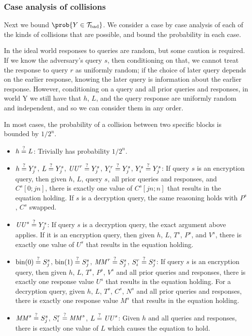 \documentclass[hctr.tex]{subfiles}
\begin{document}
\subsubsection{Case analysis of collisions}
Next we bound \(\prob{Y \in \Tb}\).
We consider a case by case analysis of
each of the kinds of collisions that are
possible, and bound the probability in each case.

In the ideal world responses to queries are random,
but some caution is required.
If we know the adversary's query \(s\), then conditioning on that,
we cannot treat the response to query \(r\) as uniformly random;
if the choice of later query depends on the earlier response,
knowing the later query is information about the earlier response.
However, conditioning on a query and all prior queries and responses,
in world Y we still have that \(h\), \(L\), and the
query response are uniformly random and independent,
and so we can consider them in any order.


In most cases, the probability of a collision
between two specific blocks is bounded by \(1/2^n\).

\begin{itemize}
    \item \(h \stackrel{\text{?}}{=} L\):
    Trivially has probability \(1/2^n\).
    \item
    \(h \stackrel{\text{?}}{=} Y_j^s\),
    \(L \stackrel{\text{?}}{=} Y_j^s\),
    \(\mathit{UU}^r \stackrel{\text{?}}{=} Y_j^s\),
    \(Y_i^r \stackrel{\text{?}}{=} Y_j^s\),
    \(Y_i^s \stackrel{\text{?}}{=} Y_j^s\): 
    If query \(s\) is an encryption query,
    then given \(h\), \(L\), query \(s\), 
    all prior queries and responses, and
    \(C^s[0;jn]\), there is exactly one value of
    \(C^s[jn;n]\) that results in the equation holding.
    If \(s\) is a decryption query, the same reasoning holds
    with \(P^s\), \(C^s\) swapped.
    \item 
    \(\mathit{UU}^s \stackrel{\text{?}}{=} Y_j^s\):
    If query \(s\) is a decryption query,
    the exact argument above applies.
    If it is an encryption query,
    then given \(h\), \(L\), \(T^s\), \(P^s\),
    and \(V^s\), there is exactly
    one value of \(U^s\) that results
    in the equation holding.
    \item 
    \(\operatorname{bin}(0) \stackrel{\text{?}}{=} S_j^s\),
    \(\operatorname{bin}(1) \stackrel{\text{?}}{=} S_j^s\),
    \(\mathit{MM}^r \stackrel{\text{?}}{=} S_j^s\),
    \(S_i^r \stackrel{\text{?}}{=} S_j^s\):
    If query \(s\) is an encryption query,
    then given \(h\), \(L\), \(T^s\),
    \(P^s\), \(V^s\)
    and all prior queries and responses,
    there is exactly one response value \(U^s\)
    that results in the equation holding.
    For a decryption query, 
    given \(h\), \(L\), \(T^s\),
    \(C^s\), \(N^s\)
    and all prior queries and responses,
    there is exactly one response value \(M^s\)
    that results in the equation holding.
    \item
    \(\mathit{MM}^s \stackrel{\text{?}}{=} S_j^s\),
    \(S_i^r \stackrel{\text{?}}{=} \mathit{MM}^s\),
    \(L \stackrel{\text{?}}{=} \mathit{UU}^s\):
    Given \(h\) and all queries and responses,
    there is exactly one value of \(L\)
    which causes the equation to hold.
\end{itemize}
\end{document}
